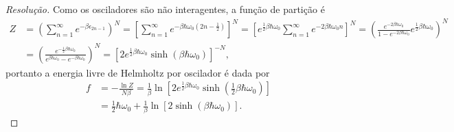 \begin{proof}[Resolução]
    Como os osciladores são não interagentes, a função de partição é
    \begin{align*}
        Z &= \left(\sum_{n = 1}^\infty e^{-\beta\epsilon_{2n-1}}\right)^N = \left[\sum_{n=1}^\infty e^{-\beta \hbar \omega_0\left(2n - \frac12\right)}\right]^N = \left[e^{\frac12\beta \hbar \omega_0} \sum_{n=1}^\infty e^{-2\beta \hbar \omega_0 n}\right]^N = \left(\frac{e^{- 2\beta \hbar \omega_0}}{1 - e^{-2\beta \hbar \omega_0}} e^{\frac12 \beta \hbar \omega_0}\right)^N\\
          &= \left(\frac{e^{-\frac12\beta \hbar \omega_0}}{e^{\beta \hbar \omega_0} - e^{-\beta \hbar \omega_0}}\right)^N = \left[2e^{\frac12 \beta \hbar \omega_0}\sinh\left(\beta\hbar \omega_0\right)\right]^{-N},
    \end{align*}
    portanto a energia livre de Helmholtz por oscilador é dada por
    \begin{align*}
        f &= -\frac{\ln Z}{N \beta} = \frac{1}{\beta} \ln \left[2 e^{\frac12 \beta \hbar \omega_0}\sinh\left(\frac12\beta \hbar \omega_0\right)\right]\\
          &=  \frac 12 \hbar \omega_0 + \frac1\beta \ln\left[2\sinh(\beta \hbar \omega_0)\right].
    \end{align*}


\end{proof}

